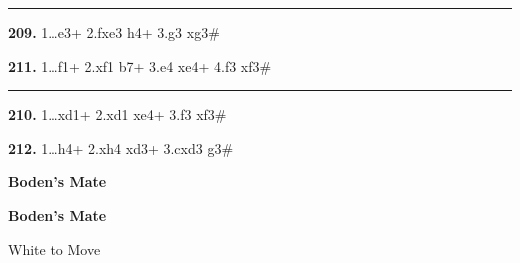 \documentclass[12pt,twoside]{article}
\begin{document}
\noindent\rule{\textwidth}{0.4pt}

\vspace{0.15em}

\noindent{}

\vspace{0.75em}

{\footnotesize\sloppy
\noindent
\begin{minipage}[t]{\textwidth}
    \begin{minipage}[c]{0.47\textwidth}
{\bfseries 209.} 1\ldots \symqueen{}e3+ 2.fxe3 \symbishop{}h4+ 3.g3 \symbishop{}xg3\#
        \vspace{0.45em}

{\bfseries 211.} 1\ldots \symqueen{}f1+ 2.\symrook{}xf1 \symbishop{}b7+ 3.\symbishop{}e4 \symbishop{}xe4+ 4.\symqueen{}f3 \symbishop{}xf3\#    \end{minipage}
        \hfill
    \begin{minipage}[c][4.9\baselineskip][c]{0.02\textwidth}
        \centering\rule{0.4pt}{4.7\baselineskip}
    \end{minipage}
    \hfill
    \begin{minipage}[c]{0.47\textwidth}
{\bfseries 210.} 1\ldots \symqueen{}xd1+ 2.\symqueen{}xd1 \symbishop{}xe4+ 3.\symqueen{}f3 \symbishop{}xf3\#
        \vspace{0.45em}

{\bfseries 212.} 1\ldots \symqueen{}h4+ 2.\symknight{}xh4 \symknight{}xd3+ 3.cxd3 \symbishop{}g3\#    \end{minipage}
\end{minipage}
}
\newpage\cleardoublepage

\thispagestyle{empty}

\vspace*{0.34\textheight}

\begin{center}
{\Huge\bfseries Boden's Mate\par}
\end{center}

\vfill
{}
\newpage\null\thispagestyle{empty}\newpage

\begin{center}
\Large\bfseries Boden's Mate

\vspace{0.15em}
\normalsize White to Move
\end{center}
\end{document}

